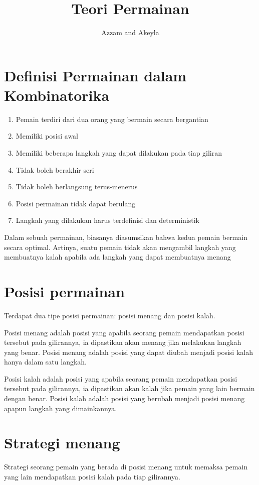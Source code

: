 \documentclass[11pt]{scrartcl}
\title{Teori Permainan}
\author{Azzam and Akeyla}
\begin{document}
\maketitle

\renewcommand*\contentsname{Daftar Isi}
\tableofcontents

\newpage

\section{Definisi Permainan dalam Kombinatorika}
\begin{enumerate}
    \item Pemain terdiri dari dua orang yang bermain secara bergantian
    \item Memiliki posisi awal
    \item Memiliki beberapa langkah yang dapat dilakukan pada tiap giliran
    \item Tidak boleh berakhir seri
    \item Tidak boleh berlangsung terus-menerus
    \item Posisi permainan tidak dapat berulang
    \item Langkah yang dilakukan harus terdefinisi dan deterministik
\end{enumerate}
Dalam sebuah permainan, biasanya diasumsikan bahwa kedua pemain bermain secara optimal. Artinya, suatu pemain tidak akan mengambil langkah yang membuatnya kalah apabila ada langkah yang dapat membuatnya menang

\section{Posisi permainan}
Terdapat dua tipe posisi permainan: posisi menang dan posisi kalah.

Posisi menang adalah posisi yang apabila seorang pemain mendapatkan posisi tersebut pada gilirannya, ia dipastikan akan menang jika melakukan langkah yang benar.
Posisi menang adalah posisi yang dapat diubah menjadi posisi kalah hanya dalam satu langkah.

Posisi kalah adalah posisi yang apabila seorang pemain mendapatkan posisi tersebut pada gilirannya, ia dipastikan akan kalah jika pemain yang lain bermain dengan benar.
Posisi kalah adalah posisi yang berubah menjadi posisi menang apapun langkah yang dimainkannya.

\section{Strategi menang}
Strategi seorang pemain yang berada di posisi menang untuk memaksa pemain yang lain mendapatkan posisi kalah pada tiap gilirannya.
\end{document}
